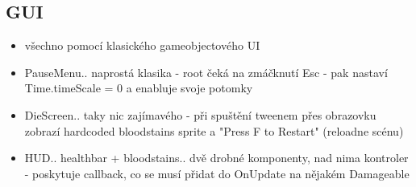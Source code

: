 \subsection{GUI}
\begin{itemize}
  \item všechno pomocí klasického gameobjectového UI
  \item PauseMenu.. naprostá klasika - root čeká na zmáčknutí Esc - pak nastaví Time.timeScale = 0 a enabluje svoje potomky
  \item DieScreen.. taky nic zajímavého - při spuštění tweenem přes obrazovku zobrazí hardcoded bloodstains sprite a "Press F to Restart" (reloadne scénu)
  \item HUD.. healthbar + bloodstains.. dvě drobné komponenty, nad nima kontroler - poskytuje callback, co se musí přidat do OnUpdate na nějakém Damageable
\end{itemize}


